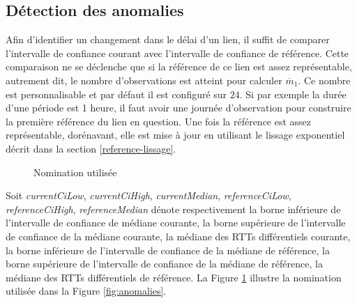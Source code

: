 \subsection{Détection des anomalies} \label{Detection-anomalies}
Afin d'identifier un changement dans le délai d'un lien, il suffit de comparer l'intervalle de confiance courant avec l'intervalle de 
confiance de référence. Cette comparaison ne se déclenche que si la référence de ce lien est assez représentable, autrement dit, le nombre d'observations est atteint pour calculer $\overline{m}_{1}$. Ce nombre est personnalisable et par défaut il est configuré sur $ 24 $. Si par exemple la durée d'une période est 1 heure, il faut avoir une journée d'observation pour construire la première référence du lien en question. Une fois la référence est  assez représentable, dorénavant,  elle est mise à jour en utilisant  le lissage exponentiel décrit dans la section \ref{reference-lissage}.
\begin{figure}
	\captionsetup{justification=centering}
	
	\resizebox{.4\textwidth}{!}{
		
	}
	\caption{Nomination utilisée}
	\label{fig:explainCis}
\end{figure}


Soit \textit{currentCiLow}, \textit{currentCiHigh}, \textit{currentMedian}, \textit{referenceCiLow}, \textit{referenceCiHigh}, \textit{referenceMedian} dénote respectivement la borne inférieure de l'intervalle de confiance de médiane courante, la borne supérieure de l'intervalle de confiance de la médiane courante, la médiane des RTTs différentiels courante, la borne inférieure de l'intervalle de confiance de la médiane de référence, la borne supérieure de l'intervalle de confiance de la médiane de référence, la médiane des RTTs différentiels de référence. La Figure 	\ref{fig:explainCis} illustre la nomination utilisée dans la Figure \ref{fig:anomalies}.

